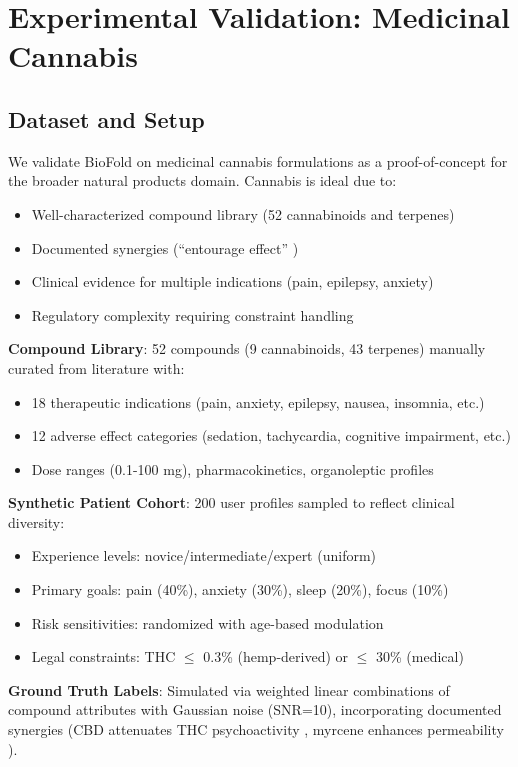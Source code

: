 \documentclass[11pt,a4paper]{article}
\begin{document}
\section{Experimental Validation: Medicinal Cannabis}

\subsection{Dataset and Setup}

We validate BioFold on medicinal cannabis formulations as a proof-of-concept for the broader natural products domain. Cannabis is ideal due to:
\begin{itemize}
    \item Well-characterized compound library (52 cannabinoids and terpenes)
    \item Documented synergies (``entourage effect'' \cite{Russo2011})
    \item Clinical evidence for multiple indications (pain, epilepsy, anxiety)
    \item Regulatory complexity requiring constraint handling
\end{itemize}

\textbf{Compound Library}: 52 compounds (9 cannabinoids, 43 terpenes) manually curated from literature with:
\begin{itemize}
    \item 18 therapeutic indications (pain, anxiety, epilepsy, nausea, insomnia, etc.)
    \item 12 adverse effect categories (sedation, tachycardia, cognitive impairment, etc.)
    \item Dose ranges (0.1-100 mg), pharmacokinetics, organoleptic profiles
\end{itemize}

\textbf{Synthetic Patient Cohort}: 200 user profiles sampled to reflect clinical diversity:
\begin{itemize}
    \item Experience levels: novice/intermediate/expert (uniform)
    \item Primary goals: pain (40\%), anxiety (30\%), sleep (20\%), focus (10\%)
    \item Risk sensitivities: randomized with age-based modulation
    \item Legal constraints: THC $\leq$ 0.3\% (hemp-derived) or $\leq$ 30\% (medical)
\end{itemize}

\textbf{Ground Truth Labels}: Simulated via weighted linear combinations of compound attributes with Gaussian noise (SNR=10), incorporating documented synergies (CBD attenuates THC psychoactivity \cite{Niesink2013}, myrcene enhances permeability \cite{DoVale2002}).
\end{document}
